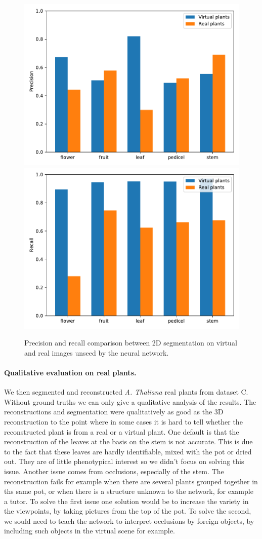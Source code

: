 \begin{figure}[h!]
    \centering \includegraphics[width =
0.5\linewidth]{figures/eval_precision_real.pdf}\includegraphics[width =
0.5\linewidth]{figures/eval_recall_real.pdf}
    \caption{Precision and recall comparison between 2D segmentation on
virtual and real images unseed by the neural network.} \label{fig:prec_recall_2d_3d}
\end{figure}

\paragraph{Qualitative evaluation on real plants.}
We then segmented and reconstructed  \emph{A. Thaliana} real plants from dataset C. Without ground truths we can only give a qualitative analysis of the results. The reconstructions and segmentation were qualitatively as good as the 3D reconstruction to the point where in some cases it is hard to tell whether the reconstructed plant is from a real or a virtual plant. One default is that the reconstruction of the leaves at the basis on the stem is not accurate. This is due to the fact that these leaves are hardly identifiable, mixed with the pot or dried out. They are of little phenotypical interest so we didn't focus on solving this issue. Another issue comes from occlusions, especially of the stem. The reconstruction fails for example when there are several plants grouped together in ths same pot, or when there is a structure unknown to the network, for example a tutor. To solve the first issue one solution would be to increase the variety in the viewpoints, by taking pictures from the top of the pot. To solve the second, we sould need to teach the network to interpret occlusions by foreign objects, by including such objects in the virtual scene for example.

